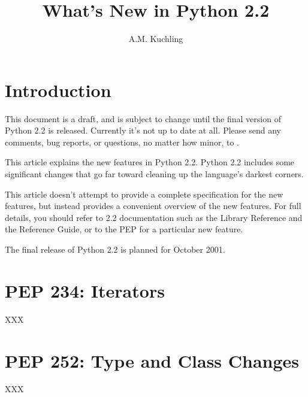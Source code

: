 \documentclass{howto}
\title{What's New in Python 2.2}
\author{A.M. Kuchling}
\begin{document}
\maketitle\tableofcontents

\section{Introduction}

{\large This document is a draft, and is subject to change until the
final version of Python 2.2 is released.  Currently it's not up to
date at all.  Please send any comments, bug reports, or questions, no
matter how minor, to .  }

This article explains the new features in Python 2.2.  
Python 2.2 includes some significant changes that go far toward cleaning up
the language's darkest corners.

This article doesn't attempt to provide a complete specification for
the new features, but instead provides a convenient overview of the
new features.  For full details, you should refer to 2.2 documentation
such as the Library Reference and the Reference Guide, or to the PEP
for a particular new feature.

The final release of Python 2.2 is planned for October 2001.

\section{PEP 234: Iterators}

XXX

\begin{seealso}


\end{seealso}

\section{PEP 252: Type and Class Changes}

XXX

\begin{seealso}


\end{seealso}
\end{document}
